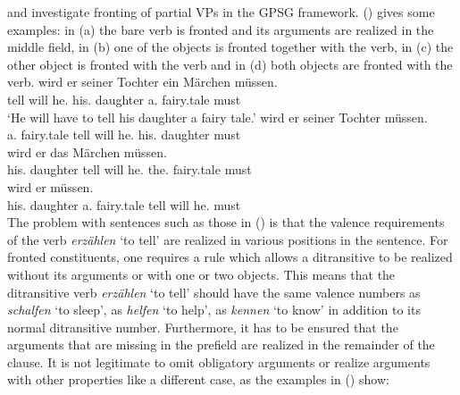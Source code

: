 \citet{Nerbonne86a} and \citet{Johnson86a} investigate fronting of partial VPs in the GPSG
framework.
() gives some examples: in (a) the bare verb is fronted and its arguments are realized
in the middle field, in (b) one of the objects is fronted together with the verb, in
(c) the other object is fronted with the verb and in
(d) both objects are fronted with the verb.
\eal
\ex 
\gll [Erzählen] wird er        seiner     Tochter  ein      Märchen müssen.\\
     \spacebr{}tell     will he.\NOM{} his.\DAT{} daughter a.\ACC{} fairy.tale must\\
\glt `He will have to tell his daughter a fairy tale.'
\ex 
{} wird er seiner Tochter müssen.\\
     \spacebr{}a.\ACC{} fairy.tale tell will he.\NOM{} his.\ACC{} daughter must\\
\ex 
{} wird er das Märchen müssen.\\
     \spacebr{}his.\DAT{} daughter tell will he.\NOM{} the.\ACC{} fairy.tale  must\\
\ex 
{} wird er müssen.\\
     \spacebr{}his.\DAT{} daughter a.\ACC{} fairy.tale tell will he.\NOM{} must\\
\zl
The problem with sentences such as those in () is that the valence requirements of the verb
\emph{erzählen} `to tell' are realized in various positions in the sentence. For fronted
constituents, one requires a rule which allows a ditransitive to be realized without its arguments
or with one or two objects. This means that the ditransitive verb \emph{erzählen} `to tell' should
have the same valence numbers as \emph{schalfen} `to sleep', as \emph{helfen} `to help', as
\emph{kennen} `to know' in addition to its normal ditransitive number. Furthermore, it has to be ensured that the arguments that are
missing in the prefield are realized in the remainder of the clause. It is not legitimate to omit
obligatory arguments or realize arguments with other properties like a different case, as the
examples in () show:
\eal
{}
